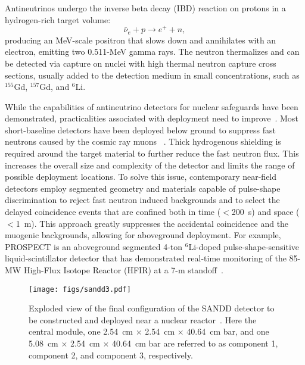 \documentclass[final,5p,times,twocolumn]{elsarticle}
\begin{document}
Antineutrinos undergo the inverse beta decay (IBD) reaction on protons in a hydrogen-rich target volume:
%
\begin{equation}\label{Eq:ibd}
    \bar{\nu}_e + p \rightarrow e^{+} + n,
\end{equation}
%
producing an MeV-scale positron that slows down and annihilates with an electron, emitting two 0.511-MeV gamma rays. The neutron thermalizes and can be detected via capture on nuclei with high thermal neutron capture cross sections, usually added to the detection medium in small concentrations, such as $^{155}$Gd, $^{157}$Gd, and $^{6}$Li.

While the capabilities of antineutrino detectors for nuclear safeguards have been demonstrated, practicalities associated with deployment need to improve~\cite{Bernstein2010}. 
Most short-baseline detectors have been deployed below ground to suppress fast neutrons caused by the cosmic ray muons ~\cite{Bowden:2006hu,rovno1994}. Thick hydrogenous shielding is required around the target material to further reduce the fast neutron flux.
This increases the overall size and complexity of the detector and limits the range of possible deployment locations.
To solve this issue, contemporary near-field detectors employ segmented geometry and materials capable of pulse-shape discrimination to reject fast neutron induced backgrounds and to select the delayed coincidence events that are confined both in time ($<$200~{\textmu}s) and space ($<$1~m).
This approach greatly suppresses the accidental coincidence and the muogenic backgrounds, allowing for aboveground deployment. 
For example, PROSPECT is an aboveground segmented 4-ton $^6$Li-doped pulse-shape-sensitive liquid-scintillator detector that has demonstrated real-time monitoring of the 85-MW High-Flux Isotope Reactor (HFIR) at a 7-m standoff~\cite{prospect2018}. 

\begin{figure}[ht!]
	\begin{center}
    \texttt{[image: figs/sandd3.pdf]}
	\end{center}
    \caption{Exploded view of the final configuration of the SANDD detector to be constructed and deployed near a nuclear reactor~\cite{SANDD1}. Here the central module, one 2.54~cm $\times$ 2.54~cm $\times$ 40.64~cm bar, and one 5.08~cm $\times$ 2.54~cm $\times$ 40.64~cm bar are referred to as component 1, component 2, and component 3, respectively.}\label{fig_SANDD_diagram}
\end{figure}
\end{document}
